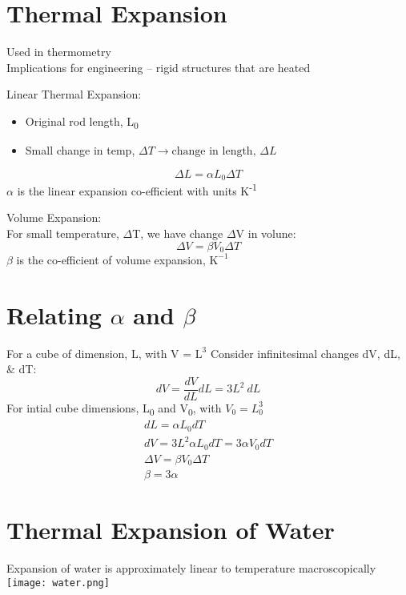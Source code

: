 \documentclass[a4paper, 11pt, fleqn, normalem]{report}
\begin{document}
\section*{Thermal Expansion}
Used in thermometry \\
Implications for engineering -- rigid structures that are heated

Linear Thermal Expansion:
\vspace{-8pt}
\begin{itemize}
    \item Original rod length, L\textsubscript{0}
    \item Small change in temp, ${\Delta}T \rightarrow \text{change in length, } {\Delta}L$
\end{itemize}
\vspace{-8pt}
\begin{equation*}
    {\Delta}L = {\alpha}L_{0}{\Delta}T
\end{equation*}
$\alpha$ is the linear expansion co-efficient with units K\textsuperscript{-1}

Volume Expansion:\\
For small temperature, $\Delta$T, we have change $\Delta$V in volune:
\begin{equation*}
    {\Delta}V = {\beta}V_{0}{\Delta}T
\end{equation*}
$\beta$ is the co-efficient of volume expansion, $\text{K}^{-1}$

\section*{Relating ${\alpha}$ and ${\beta}$}
For a cube of dimension, L, with V = $\text{L}^{3}$
Consider infinitesimal changes dV, dL, \& dT:
\begin{equation*}
	dV = \dfrac{dV}{dL}dL = 3L^{2}~dL
\end{equation*}
For intial cube dimensions, L\textsubscript{0} and V\textsubscript{0}, with $V_{0} = L_{0}^{3}$
\begin{gather*}
	dL = {\alpha}L_{0}dT \\
	dV = 3L^{2}{\alpha}L_{0}dT = 3{\alpha}V_{0}dT \\
	{\Delta}V = {\beta}V_{0}{\Delta}T \\
	\beta = 3\alpha
\end{gather*}

\section*{Thermal Expansion of Water}
Expansion of water is approximately linear to temperature macroscopically \\
\texttt{[image: water.png]}
\end{document}
